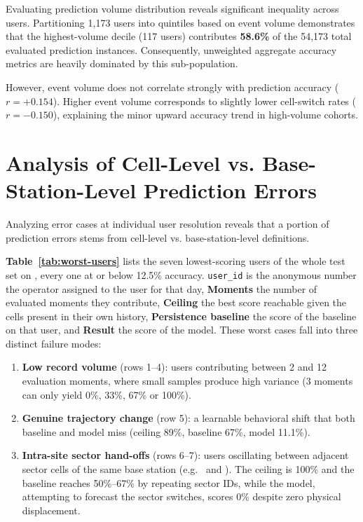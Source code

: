 Evaluating prediction volume distribution reveals significant inequality across users. Partitioning 1,173 users into quintiles based on event volume demonstrates that the highest-volume decile (117 users) contributes \textbf{58.6\%} of the 54,173 total evaluated prediction instances. Consequently, unweighted aggregate accuracy metrics are heavily dominated by this sub-population.

However, event volume does not correlate strongly with prediction accuracy ($r = +0.154$). Higher event volume corresponds to slightly lower cell-switch rates ($r = -0.150$), explaining the minor upward accuracy trend in high-volume cohorts.

\section{Analysis of Cell-Level vs. Base-Station-Level Prediction Errors}

Analyzing error cases at individual user resolution reveals that a portion of prediction errors stems from cell-level vs. base-station-level definitions.

\textbf{Table~\ref{tab:worst-users}} lists the seven lowest-scoring users of the whole test set on \Dfilt{}, every one at or below 12.5\% accuracy. \texttt{user\_id} is the anonymous number the operator assigned to the user for that day, \textbf{Moments} the number of evaluated moments they contribute, \textbf{Ceiling} the best score reachable given the cells present in their own history, \textbf{Persistence baseline} the score of the baseline on that user, and \textbf{Result} the score of the model. These worst cases fall into three distinct failure modes:
\begin{enumerate}
  \item \textbf{Low record volume} (rows 1--4): users contributing between 2 and 12 evaluation moments, where small samples produce high variance (3 moments can only yield 0\%, 33\%, 67\% or 100\%).
  \item \textbf{Genuine trajectory change} (row 5): a learnable behavioral shift that both baseline and model miss (ceiling 89\%, baseline 67\%, model 11.1\%).
  \item \textbf{Intra-site sector hand-offs} (rows 6--7): users oscillating between adjacent sector cells of the same base station (e.g.\  and ). The ceiling is 100\% and the baseline reaches 50\%--67\% by repeating sector IDs, while the model, attempting to forecast the sector switches, scores 0\% despite zero physical displacement.
\end{enumerate}

